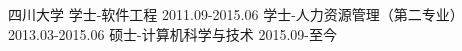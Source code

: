 


\begin{cventries}
	
	
	\cveducation
{四川大学} %
{学士-软件工程} %
{2011.09-2015.06} %
{学士-人力资源管理（第二专业）} %
{2013.03-2015.06} %
{硕士-计算机科学与技术} %
{2015.09-至今} %

	
\end{cventries}
